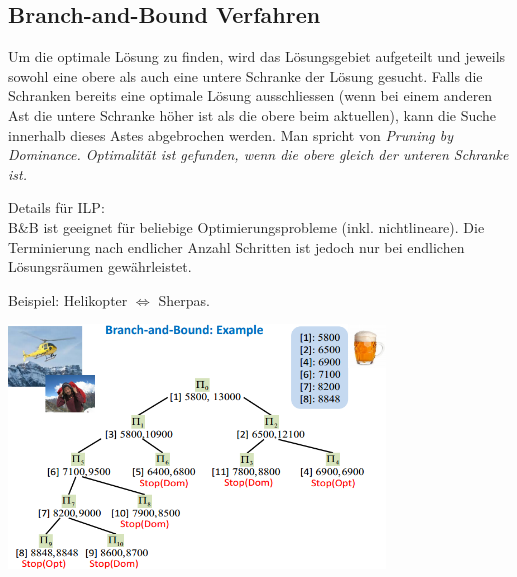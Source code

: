 \subsection{Branch-and-Bound Verfahren }
	\begin{minipage}{8cm}
		Um die optimale Lösung zu finden, wird das Lösungsgebiet aufgeteilt und jeweils sowohl eine obere als auch eine untere Schranke der Lösung gesucht. Falls die Schranken bereits eine optimale Lösung ausschliessen (wenn bei einem anderen Ast die untere Schranke höher ist als die obere beim aktuellen), kann die Suche innerhalb dieses Astes abgebrochen werden. Man spricht von \em Pruning by Dominance\em. Optimalität ist gefunden, wenn die obere gleich der unteren Schranke ist.
		
		Details für ILP: \\
		B\&B ist geeignet für beliebige Optimierungsprobleme (inkl. nichtlineare). Die Terminierung nach endlicher Anzahl Schritten ist jedoch nur bei endlichen Lösungsräumen gewährleistet.
	\end{minipage}
	\begin{minipage}{10cm}
		Beispiel: Helikopter $\Leftrightarrow$ Sherpas.
		
		\includegraphics[width=10cm]{Content/IntProg/branch-bound}
	\end{minipage}

